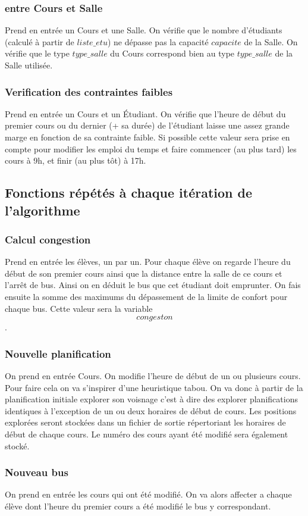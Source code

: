 \documentclass[a4paper,11pt]{article}
\begin{document}
		\subsubsection{entre Cours et Salle}
			Prend en entrée un Cours et une Salle.
			On vérifie que le nombre d'étudiants (calculé à partir de $liste\_etu$) ne dépasse pas la capacité $capacite$ de la Salle.
			On vérifie que le type $type\_salle$ du Cours correspond bien au type $type\_salle$ de la Salle utilisée.
		\subsubsection{Verification des contraintes faibles}
			Prend en entrée un Cours et un Étudiant.
			On vérifie que l'heure de début du premier cours ou du dernier (+ sa durée) de l'étudiant laisse une assez grande marge en fonction de sa contrainte faible.
			Si possible cette valeur sera prise en compte pour modifier les emploi du temps et faire commencer (au plus tard) les cours à 9h, et finir (au plus tôt) à 17h.
		\subsection{Fonctions répétés à chaque itération de l'algorithme}
			\subsubsection{Calcul congestion}
				Prend en entrée les élèves, un par un.
				Pour chaque élève on regarde l'heure du début de son premier cours ainsi que la distance entre la salle de ce cours et l'arrêt de bus. 
				Ainsi on en déduit le bus que cet étudiant doit emprunter. On fais ensuite la somme des maximums du dépassement de la limite
				de confort pour chaque bus. Cette valeur sera la variable $$congeston$$.
			\subsubsection{Nouvelle planification}
				On prend en entrée Cours.
				On modifie l'heure de début de un ou plusieurs cours. Pour faire cela on va s'inspirer d'une heuristique tabou.
				On va donc à partir de la planification initiale explorer son voisnage c'est à dire des explorer planifications identiques à l'exception
				de un ou deux horaires de début de cours.
				Les positions explorées seront stockées dans un fichier de sortie répertoriant les horaires de début de chaque cours.
				Le numéro des cours ayant été modifié sera également stocké.
			\subsubsection{Nouveau bus}
				On prend en entrée les cours qui ont été modifié.
				On va alors affecter a chaque élève dont l'heure du premier cours a été modifié le bus y correspondant.
\end{document}
